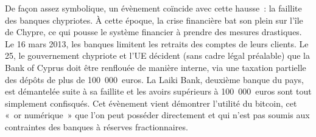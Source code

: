 De façon assez symbolique, un évènement coïncide avec cette hausse~: la faillite des banques chypriotes. À cette époque, la crise financière bat son plein sur l'île de Chypre, ce qui pousse le système financier à prendre des mesures drastiques. Le 16 mars 2013, les banques limitent les retraits des comptes de leurs clients. Le 25, le gouvernement chypriote et l'UE décident (sans cadre légal préalable) que la Bank of Cyprus doit être renflouée de manière interne, via une taxation partielle des dépôts de plus de 100~000~euros. La Laiki Bank, deuxième banque du pays, est démantelée suite à sa faillite et les avoirs supérieurs à 100~000~euros sont tout simplement confisqués. Cet évènement vient démontrer l'utilité du bitcoin, cet «~or numérique~» que l'on peut posséder directement et qui n'est pas soumis aux contraintes des banques à réserves fractionnaires.

